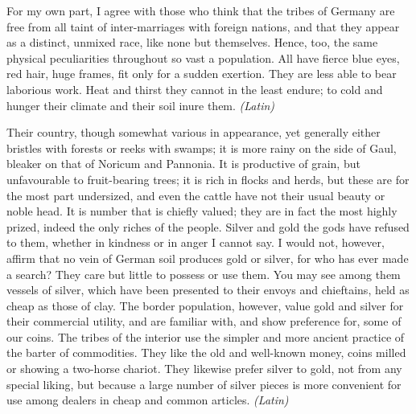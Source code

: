 
For my own part, I agree with those who think that the tribes of Germany are free from all taint of inter-marriages with foreign nations, and that they appear as a distinct, unmixed race, like none but themselves. Hence, too, the same physical peculiarities throughout so vast a population. All have fierce blue eyes, red hair, huge frames, fit only for a sudden exertion. They are less able to bear laborious work. Heat and thirst they cannot in the least endure; to cold and hunger their climate and their soil inure them. \emph{(Latin)}


Their country, though somewhat various in appearance, yet generally either bristles with forests or reeks with swamps; it is more rainy on the side of Gaul, bleaker on that of Noricum and Pannonia. It is productive of grain, but unfavourable to fruit-bearing trees; it is rich in flocks and herds, but these are for the most part undersized, and even the cattle have not their usual beauty or noble head. It is number that is chiefly valued; they are in fact the most highly prized, indeed the only riches of the people. Silver and gold the gods have refused to them, whether in kindness or in anger I cannot say. I would not, however, affirm that no vein of German soil produces gold or silver, for who has ever made a search? They care but little to possess or use them. You may see among them vessels of silver, which have been presented to their envoys and chieftains, held as cheap as those of clay. The border population, however, value gold and silver for their commercial utility, and are familiar with, and show preference for, some of our coins. The tribes of the interior use the simpler and more ancient practice of the barter of commodities. They like the old and well-known money, coins milled or showing a two-horse chariot. They likewise prefer silver to gold, not from any special liking, but because a large number of silver pieces is more convenient for use among dealers in cheap and common articles. \emph{(Latin)}


